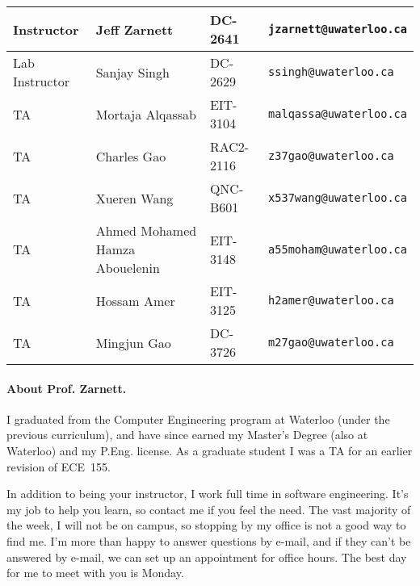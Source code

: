\documentclass[letterpaper,10pt]{article}
\begin{document}
\begin{table}[h]
        \begin{center}
        \begin{tabular}{l|l|l|l}
                                        Instructor & Jeff Zarnett & DC-2641 & \texttt{jzarnett@uwaterloo.ca} \\
                                        \hline
                                        Lab Instructor & Sanjay Singh & DC-2629 & \texttt{ssingh@uwaterloo.ca}\\
                                        \hline

                                    TA & Mortaja Alqassab & EIT-3104 & \texttt{malqassa@uwaterloo.ca} \\
                                    TA & Charles Gao & RAC2-2116 & \texttt{z37gao@uwaterloo.ca} \\
                                    TA & Xueren Wang & QNC-B601 & \texttt{x537wang@uwaterloo.ca} \\
                                    TA & Ahmed Mohamed Hamza Abouelenin & EIT-3148 & \texttt{a55moham@uwaterloo.ca} \\
                                    TA & Hossam Amer & EIT-3125 & \texttt{h2amer@uwaterloo.ca} \\
                                    TA & Mingjun Gao & DC-3726 & \texttt{m27gao@uwaterloo.ca} \\
                                                   \end{tabular}
        \end{center}
\end{table}


\paragraph{About Prof. Zarnett.}
I graduated from the Computer Engineering program at Waterloo (under the previous curriculum), and have since earned my Master's Degree (also at Waterloo) and my P.Eng. license. As a graduate student I was a TA for an earlier revision of ECE~155.

In addition to being your instructor, I work full time in software engineering. It's my job to help you learn, so contact me if you feel the need. The vast majority of the week, I will not be on campus, so stopping by my office is not a good way to find me. I'm more than happy to answer questions by e-mail, and if they can't be answered by e-mail, we can set up an appointment for office hours. The best day for me to meet with you is Monday.
\end{document}
